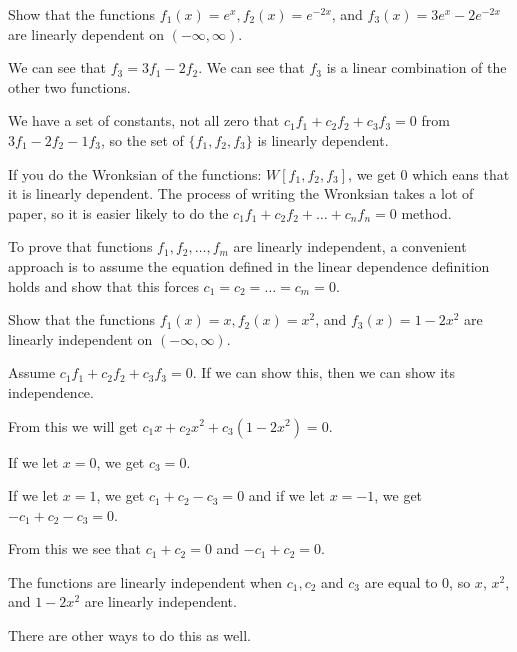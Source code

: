 \documentclass[../diffeq.tex]{subfiles}
\begin{document}
\begin{example}
    Show that the functions $f_1(x)=e^x, f_2(x)=e^{-2x}$, and $f_3(x)=3e^x-2e^{-2x}$ are linearly dependent on $(-\infty,\infty)$.

    We can see that $f_3=3f_1-2f_2$. We can see that $f_3$ is a linear combination of the other two functions.

    We have a set of constants, not all zero that $c_1f_1+c_2f_2+c_3f_3=0$ from $3f_1-2f_2-1f_3$, so the set of $\{f_1,f_2,f_3\}$ is linearly dependent.

    If you do the Wronksian of the functions: $W[f_1,f_2,f_3]$, we get 0 which eans that it is linearly dependent. The process of writing the Wronksian takes a lot of paper, so it is easier likely to do the $c_1f_1+c_2f_2+\dots +c_nf_n=0$ method.
\end{example}

To prove that functions $f_1,f_2,\dots, f_m$ are linearly independent, a convenient approach is to assume the equation defined in the linear dependence definition holds and show that this forces $c_1=c_2=\dots = c_m =0$. 

\begin{example}
    Show that the functions $f_1(x)=x, f_2(x)=x^2$, and $f_3(x)=1-2x^2$ are linearly independent on $(-\infty,\infty)$.

    Assume $c_1f_1+c_2f_2+c_3f_3=0$. If we can show this, then we can show its independence.

    From this we will get $c_1x+c_2x^2+c_3(1-2x^2)=0$.

    If we let $x=0$, we get $c_3=0$.

    If we let $x=1$, we get $c_1+c_2-c_3=0$ and if we let $x=-1$, we get $-c_1+c_2-c_3=0$. 

    From this we see that $c_1+c_2=0$ and $-c_1+c_2=0$.

    The functions are linearly independent when $c_1,c_2$ and $c_3$ are equal to 0, so $x$, $x^2$, and $1-2x^2$ are linearly independent.

    There are other ways to do this as well.
\end{example}
\end{document}
